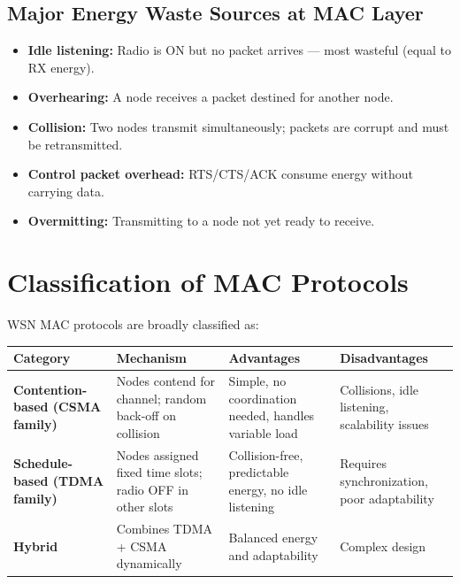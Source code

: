 \documentclass[12pt,a4paper]{article}
\renewcommand{\arraystretch}{1.45}
\begin{document}
\subsection{Major Energy Waste Sources at MAC Layer}
\begin{itemize}[leftmargin=*, itemsep=3pt]
  \item \textbf{Idle listening:} Radio is ON but no packet arrives --- most wasteful (equal to RX energy).
  \item \textbf{Overhearing:} A node receives a packet destined for another node.
  \item \textbf{Collision:} Two nodes transmit simultaneously; packets are corrupt and must be retransmitted.
  \item \textbf{Control packet overhead:} RTS/CTS/ACK consume energy without carrying data.
  \item \textbf{Overmitting:} Transmitting to a node not yet ready to receive.
\end{itemize}

\section{Classification of MAC Protocols}

WSN MAC protocols are broadly classified as:

\par\noindent
{\renewcommand{\arraystretch}{1.5}%
\begin{tabularx}{\linewidth}{|B{3.0cm}|Y|Y|Y|}
\hline
\textbf{Category} & \textbf{Mechanism} & \textbf{Advantages} & \textbf{Disadvantages} \\
\hline
\textbf{Contention-based (CSMA family)} & Nodes contend for channel; random back-off on collision & Simple, no coordination needed, handles variable load & Collisions, idle listening, scalability issues \\
\hline
\textbf{Schedule-based (TDMA family)} & Nodes assigned fixed time slots; radio OFF in other slots & Collision-free, predictable energy, no idle listening & Requires synchronization, poor adaptability \\
\hline
\textbf{Hybrid} & Combines TDMA + CSMA dynamically & Balanced energy and adaptability & Complex design \\
\hline
\end{tabularx}}
\end{document}
